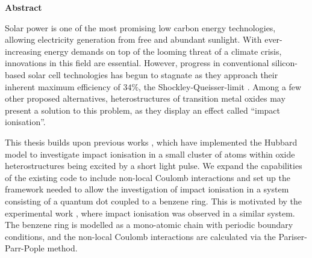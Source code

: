 \def\changemargin#1#2{\list{}{\rightmargin#2\leftmargin#1}\item[]}
\let\endchangemargin=\endlist 

{\small\begin{center}%
\bfseries{Abstract}
\end{center}}

\begin{changemargin}{1.5cm}{1.5cm}

Solar power is one of the most promising low carbon energy technologies, allowing electricity generation from free and abundant sunlight. With ever-increasing energy demands on top of the looming threat of a climate crisis, innovations in this field are essential. However, progress in conventional silicon-based solar cell technologies has begun to stagnate as they approach their inherent maximum efficiency of $34\%$, the Shockley-Queisser-limit \cite{shockley_queisser}. Among a few other proposed alternatives, heterostructures of transition metal oxides may present a solution to this problem, as they display an effect called ``impact ionisation''.

\smallskip

This thesis builds upon previous works \cite{innerberger, worm_bachelor, prauhart, worm_project}, which have implemented the Hubbard model to investigate impact ionisation in a small cluster of atoms within oxide heterostructures being excited by a short light pulse. We expand the capabilities of the existing code to include non-local Coulomb interactions and set up the framework needed to allow the investigation of impact ionisation in a system consisting of a quantum dot coupled to a benzene ring.
This is motivated by the experimental work \cite{qd_motivation}, where impact ionisation was observed in a similar system.
The benzene ring is modelled as a mono-atomic chain with periodic boundary conditions, and the non-local Coulomb interactions are calculated via the Pariser-Parr-Pople method. 
\end{changemargin}